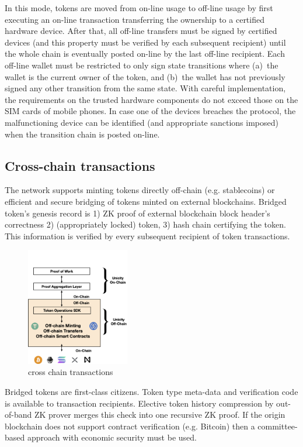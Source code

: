 \documentclass{article}
\begin{document}
In this mode, tokens are moved from on-line usage to off-line usage by first executing an on-line transaction transferring the ownership to a certified hardware device. After that, all off-line transfers must be signed by certified devices (and this property must be verified by each subsequent recipient) until the whole chain is eventually posted on-line by the last off-line recipient. Each off-line wallet must be restricted to only sign state transitions where (a)~the wallet is the current owner of the token, and (b)~the wallet has not previously signed any other transition from the same state. With careful implementation, the requirements on the trusted hardware components do not exceed those on the SIM cards of mobile phones. In case one of the devices breaches the protocol, the malfunctioning device can be identified (and appropriate sanctions imposed) when the transition chain is posted on-line.


\subsection{Cross-chain  transactions}

The network supports minting tokens directly off-chain (e.g. stablecoins) or efficient and secure bridging of tokens minted on external blockchains. Bridged token’s genesis record is 1) ZK proof of external blockchain block header's correctness 2) (appropriately locked) token, 3) hash chain certifying the token. This information is verified by every subsequent recipient of token transactions.


\begin{figure}[ht]
    \centering
    \includegraphics[width=0.4\textwidth]{crosschain.png}
    \caption{cross chain transactions}
    \label{fig:LowLatency2}
\end{figure}


Bridged tokens are first-class citizens. Token type meta-data and verification code is available to transaction recipients. Elective token history compression by out-of-band ZK prover merges this check into one recursive ZK proof. If the origin blockchain does not support contract verification (e.g. Bitcoin) then a committee-based approach with economic security must be used.
\end{document}
